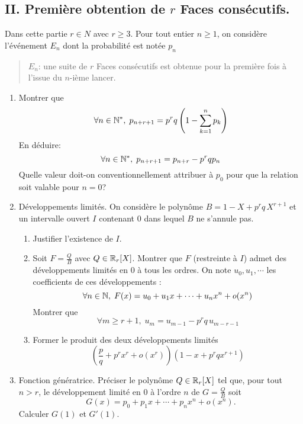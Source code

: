 \subsection*{II. Première obtention de $r$ Faces consécutifs.}
Dans cette partie $r \in N$ avec $r \geq 3$. Pour tout entier $n\geq 1$, on considère l'événement $E_n$ dont la probabilité est notée $p_n$
\begin{quote}
 $E_n$: \og une suite de $r$ Faces consécutifs est obtenue pour la première fois à l'issue du $n$-ième lancer.\fg
\end{quote}
\begin{enumerate}
 \item Montrer que 
\begin{displaymath}
\forall n \in \mathbb{N}^*, \;  p_{n+r+1} = p^r q \left( 1 - \sum_{k=1}^{n}p_k\right) 
\end{displaymath}
En déduire:
\begin{displaymath}
 \forall n\in \mathbb{N}^*, \; p_{n+r+1} = p_{n+r} - p^r q p_n
\end{displaymath}
Quelle valeur doit-on conventionnellement attribuer à $p_0$ pour que la relation soit valable pour $n=0$?
\newpage
\item Développements limités.\newline
On considère le polynôme $B = 1-X+p^rq\,X^{r+1}$ et un intervalle ouvert $I$ contenant $0$ dans lequel $B$ ne s'annule pas. 
\begin{enumerate}
 \item Justifier l'existence de $I$.
 \item Soit $F=\frac{Q}{B}$ avec $Q\in \mathbb{R}_{r
 }[X]$. Montrer que $F$ (restreinte à $I$) admet des développements limités en $0$ à tous les ordres. On note $u_0, u_1, \cdots$ les coefficients de ces développements :
\begin{displaymath}
\forall n \in \mathbb{N}, \; F(x) = u_0 + u_1x + \cdots + u_n x^n + o(x^n)
\end{displaymath}
Montrer que
\begin{displaymath}
\forall m \geq r+1, \; u_m = u_{m-1} - p^rq\, u_{m-r-1} 
\end{displaymath}
\item Former le produit des deux développements limités
\begin{displaymath}
 \left( \frac{p}{q} +p^r x^r + o(x^r)\right)\left( 1 - x +p^rq x^{r+1}\right)  
\end{displaymath}
\end{enumerate}
\newpage
\item Fonction génératrice.\newline
Préciser le polynôme $Q\in \mathbb{R}_r[X]$ tel que, pour tout $n>r$, le développement limité en $0$ à l'ordre $n$ de $G=\frac{Q}{B}$ soit 
\begin{displaymath}
 G(x) = p_0 + p_1x + \cdots + p_nx^n + o(x^n).
\end{displaymath}
Calculer $G(1)$ et $G'(1)$.
\end{enumerate}


